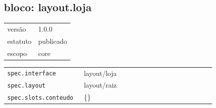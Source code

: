 \subsection*{bloco: layout.loja}
\begin{tabular}{@{}ll@{}}
versão & 1.0.0 \\
estatuto & publicado \\
escopo & core \\
\end{tabular}

\begin{tabular}{@{}p{0.35\linewidth}p{0.6\linewidth}@{}}
\texttt{spec.interface} & layout/loja \\
\texttt{spec.layout} & layout/raiz \\
\texttt{spec.slots.conteudo} & \{\} \\
\end{tabular}
